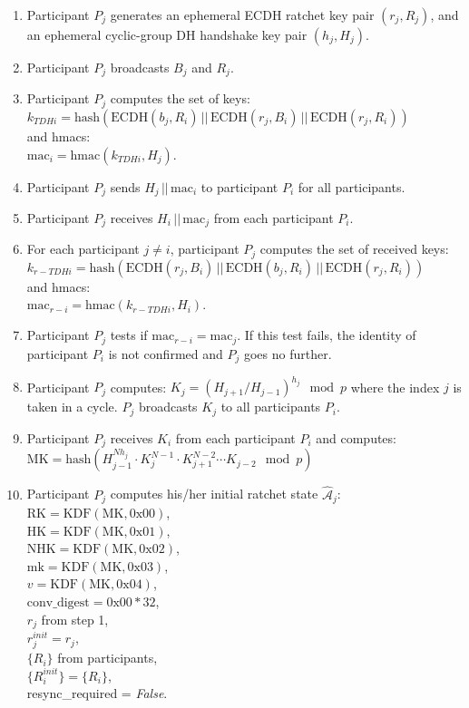 \documentclass[%
preprint,
amsmath,amssymb,
aps,
prb,
floatfix,
]{revtex4-1}
\begin{document}
\begin{enumerate}
\item Participant $P_j$ generates an ephemeral ECDH ratchet key pair $(r_j,
R_j)$, and an ephemeral cyclic-group DH handshake key pair $(h_j, H_j)$.
\item Participant $P_j$ broadcasts $B_j$ and $R_j$.
\item Participant $P_j$ computes the set of keys: \\ $k_{TDHi} =
\mathrm{hash}(\mathrm{ECDH}(b_j, R_i) \, ||
\, \mathrm{ECDH}(r_j, B_i) \, || \, \mathrm{ECDH}(r_j, R_i))$ \\ and hmacs: \\
$\mathrm{mac}_i = \mathrm{hmac}(k_{TDHi}, H_j)$.
\item Participant $P_j$ sends $H_j \, || \, \mathrm{mac}_i$ to participant $P_i$ for all
participants.
\item Participant $P_j$ receives $H_i \, || \, \mathrm{mac}_j$ from each
participant $P_i$.
\item For each participant $j \ne i$, participant $P_j$ computes the set of received keys:\\ $k_{r-TDHi} =
\mathrm{hash}(\mathrm{ECDH}(r_j, B_i) \, ||
\, \mathrm{ECDH}(b_j, R_i) \, || \, \mathrm{ECDH}(r_j, R_i))$ \\ and hmacs: \\
$\mathrm{mac}_{r-i} = \mathrm{hmac}(k_{r-TDHi}, H_i)$.
\item Participant $P_j$ tests if $\mathrm{mac}_{r-i} = \mathrm{mac}_j$. If this
test fails, the identity of participant $P_i$ is not confirmed and $P_j$ goes no
further.
\item Participant $P_j$ computes: $K_j = (H_{j+1}/H_{j-1})^{h_j} \mod p$ where the
index $j$ is taken in a cycle. $P_j$ broadcasts $K_j$ to all participants $P_i$.
\item Participant $P_j$ receives $K_i$ from each participant $P_i$ and
computes:\\ $\mathrm{MK} = \mathrm{hash}(H_{j-1}^{ N h_j} \cdot K_j^{N-1} \cdot
K_{j+1}^{N-2} \cdots K_{j-2} \mod p )$
\item Participant $P_j$ computes his/her initial ratchet state
$\mathcal{\hat{A}}_j$:\\
$\mathrm{RK} = \mathrm{KDF}(\mathrm{MK}, 0\mathrm{x}00)$, \\
$\mathrm{HK} = \mathrm{KDF}(\mathrm{MK}, 0\mathrm{x}01)$, \\
$\mathrm{NHK} = \mathrm{KDF}(\mathrm{MK}, 0\mathrm{x}02)$, \\
$\mathrm{mk} = \mathrm{KDF}(\mathrm{MK}, 0\mathrm{x}03)$, \\
$v = \mathrm{KDF}(\mathrm{MK}, 0\mathrm{x}04)$, \\
$\mathrm{conv\_digest} = 0\mathrm{x}00 * 32$, \\
$r_j$ from step 1, \\
$r_j^{init} = r_j$, \\
$\{R_i\}$ from participants, \\
$\{R_i^{init}\} = \{R_i\}$, \\
resync\_required = \textit{False}.
\end{enumerate}
\end{document}
